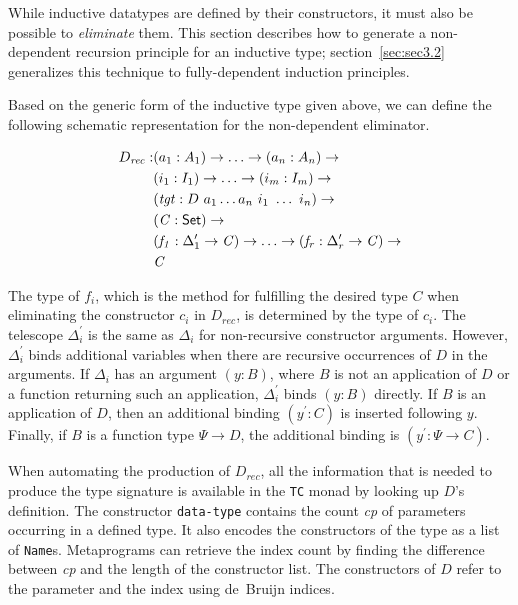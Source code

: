 \documentclass[sigplan,10pt]{acmart}
\begin{document}

While inductive datatypes are defined by their constructors, it must also be possible to \emph{eliminate} them. This section describes how to generate a non-dependent recursion principle for an inductive type; section~\ref{sec:sec3.2} generalizes this technique to fully-dependent induction principles.

Based on the generic form of the inductive type given above, we can define the following schematic representation for the non-dependent eliminator.

\begin{align*}
D_{\mathit{rec}} : & (a_1 : A_1) \to \ldots \to (a_n : A_n) \to\\
& (i_1 : I_1) \to \ldots \to (i_m : I_m) \to\\
& (\mathit{tgt} : D\ a_1 \ldots a_n\ i_1\ \ldots\ i_n) \to\\
& (\mathit{C} : \textsf{Set}{}) \to \\
& (\mathit{f_1} : \Delta_1^\prime \to \mathit{C}) \to \ldots \to (\mathit{f_r} : \Delta_r^\prime \to \mathit{C}) \to \\
& \mathit{C}
\end{align*}

The type of $f_i$, which is the method for fulfilling the desired type $C$ when eliminating the constructor $c_i$ in $D_\mathit{rec}$, is determined by the type of $c_i$.
The telescope $\Delta_i^\prime$ is the same as $\Delta_i$ for non-recursive constructor arguments.
However, $\Delta_i^\prime$ binds additional variables when there are recursive occurrences of $D$ in the arguments.
If $\Delta_i$ has an argument $(y : B)$, where $B$ is not an application of $D$ or a function returning such an application, $\Delta_i^\prime$ binds $(y : B)$ directly.
If $B$ is an application of $D$, then an additional binding $(y^\prime : C)$ is inserted following $y$.
Finally, if $B$ is a function type $\Psi \to D$, the additional binding is $(y^\prime : \Psi \to C)$. 


When automating the production of $D_{\mathit{rec}}$, all the information that is needed to produce the type signature is available in the \texttt{TC} monad by looking up $D$'s definition.
The constructor {\tt data-type} contains the count \emph{cp} of parameters occurring in a defined type. It also encodes the constructors of the type as a list of \texttt{Name}s. Metaprograms can retrieve the index count by finding the difference between \emph{cp} and the length of the constructor list. The constructors of $D$ refer to the parameter and the index using de~Bruijn indices.
\end{document}

